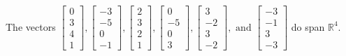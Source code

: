 \begin{exercise}
\begin{exerciseStatement}
  \end{exerciseStatement}
  \begin{exerciseAnswer}
   The vectors \(\left[\begin{array}{r}
0 \\
3 \\
4 \\
1
\end{array}\right] , \left[\begin{array}{r}
-3 \\
-5 \\
0 \\
-1
\end{array}\right] , \left[\begin{array}{r}
2 \\
3 \\
2 \\
1
\end{array}\right] , \left[\begin{array}{r}
0 \\
-5 \\
0 \\
3
\end{array}\right] , \left[\begin{array}{r}
3 \\
-2 \\
3 \\
-2
\end{array}\right] , \text{ and } \left[\begin{array}{r}
-3 \\
-1 \\
3 \\
-3
\end{array}\right]\) 
  	 do  
	span \(\mathbb{R}^4\).
  


  \end{exerciseAnswer}
\end{exercise}